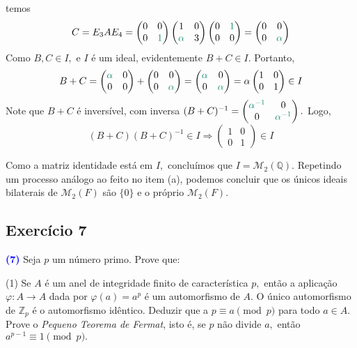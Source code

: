 \documentclass[11pt,a4paper]{article}
\newcommand{\exercicio}[1]{\subsection{Exercício #1} \textcolor{blue}{\bf(#1)}}
\newcommand{\dividiritens}[1]{\begin{tasks}[counter-format={(tsk[a])},label-width=3.6ex, label-format = {\bfseries}, column-sep = {0pt}](1) #1 \end{tasks}}
\newcommand{\pers}[1]{\textcolor{Floresta}{$\negrito{(#1)} $}}
\begin{document}
{{\[\]
temos
\[
C = E_3AE_4 = \begin{pmatrix} 0 & 0 \\ 0 & \textcolor{PineGreen}{1} \end{pmatrix}  \begin{pmatrix} 1 & 0 \\ \textcolor{PineGreen}{\alpha} & 3 \end{pmatrix}  \begin{pmatrix}  0 & \textcolor{PineGreen}{1} \\ 0 & 0 \end{pmatrix} = \begin{pmatrix} 0 & 0 \\ 0 & \textcolor{PineGreen}{\alpha} \end{pmatrix}
\]
Como $B, C \in I,$ e $I$ é um ideal, evidentemente $B + C \in I.$ Portanto,
\[
B + C = \begin{pmatrix} \textcolor{PineGreen}{\alpha} & 0 \\ 0 & 0 \end{pmatrix} + \begin{pmatrix} 0 & 0 \\ 0 & \textcolor{PineGreen}{\alpha} \end{pmatrix} = \begin{pmatrix} \textcolor{PineGreen}{\alpha} & 0 \\ 0 & \textcolor{PineGreen}{\alpha} \end{pmatrix} = \alpha \begin{pmatrix} 1 & 0 \\ 0 & 1 \end{pmatrix} \in I
\]
Note que $B + C$ é inversível, com inversa $(B + C)^{-1} = \begin{pmatrix} \textcolor{PineGreen}{\alpha^{-1}} & 0 \\ 0 & \textcolor{PineGreen}{\alpha^{-1}} \end{pmatrix}.$ Logo,
\[
(B + C)(B + C)^{-1} \in I \Rightarrow  \begin{pmatrix} 1 & 0 \\ 0 & 1 \end{pmatrix} \in I
\]

Como a matriz identidade está em $I,$ concluímos que $I = \mathcal{M}_2(\mathbb{Q}).$
\task[\pers{b}] 
\task[\pers{c}] Repetindo um processo análogo ao feito no item (a), podemos concluir que os únicos ideais bilaterais de $\mathcal{M}_2(F)$ são $\{ 0\}$ e o próprio $\mathcal{M}_2(F)$.
}
}
\exercicio{7} Seja $p$ um número primo. Prove que:\dividiritens{
\task[\pers{a}] Se $A$ é um anel de integridade finito de característica $p,$ então a aplicação $\varphi \colon A \to A$ dada por $\varphi(a) = a^p$ é um automorfismo de $A.$ 
\task[\pers{b}] O único automorfismo de $\mathbb{Z}_p$ é o automorfismo idêntico. Deduzir que a $p \equiv a \pmod p$ para todo $a \in A.$
\task[\pers{c}] Prove o \emph{Pequeno Teorema de Fermat}, isto é, se $p$ não divide $a,$ então $a^{p-1} \equiv 1 \pmod p.$
}
\end{document}
